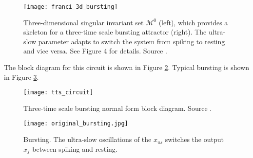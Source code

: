 \documentclass[a4paper, 12pt]{article}
\begin{document}
\begin{figure}[h!]
\texttt{[image: franci\_3d\_bursting]}
\caption{Three-dimensional singular invariant set $\mathcal{M}^0$ (left), which provides a skeleton for a three-time scale bursting attractor (right). The ultra-slow parameter adapts to switch the system from spiking to resting and vice versa. See \cite{franci2} Figure 4 for details. Source \cite{franci2}.}
\label{fig:3d_bursting}
\end{figure}

The block diagram for this circuit is shown in Figure \ref{fig:ttsbursting_circuit}. Typical bursting is shown in Figure \ref{fig:bursting_typical_oscillations}. 

\begin{figure}[h!]
\texttt{[image: tts\_circuit]}
\caption{Three-time scale bursting normal form block diagram. Source \cite{franci}.}
\label{fig:ttsbursting_circuit}
\end{figure}

 \begin{figure}[h!]
\texttt{[image: original\_bursting.jpg]}
\caption{Bursting. The ultra-slow oscillations of the $x_{us}$ switches the output $x_f$ between spiking and resting.}
\label{fig:bursting_typical_oscillations}
\end{figure}
\newpage
\end{document}

